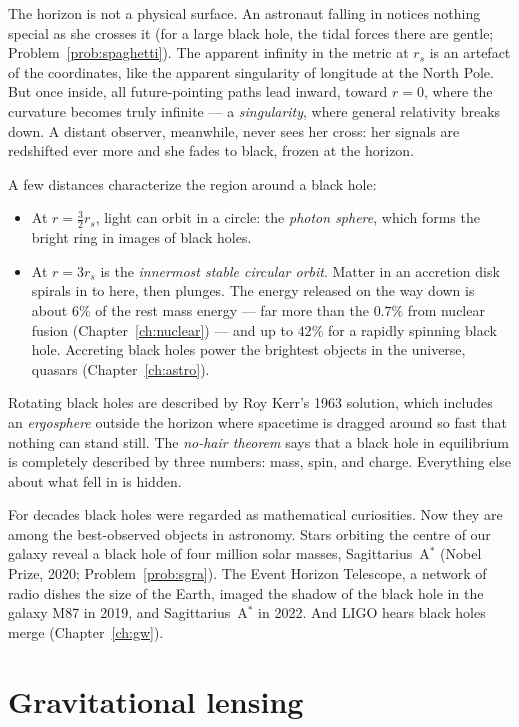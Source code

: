 The horizon is not a physical surface. An astronaut falling in notices nothing special as she crosses it (for a large black hole, the tidal forces there are gentle; Problem~\ref{prob:spaghetti}). The apparent infinity in the metric at $r_s$ is an artefact of the coordinates, like the apparent singularity of longitude at the North Pole. But once inside, all future-pointing paths lead inward, toward $r=0$, where the curvature becomes truly infinite --- a \emph{singularity}, where general relativity breaks down. A distant observer, meanwhile, never sees her cross: her signals are redshifted ever more and she fades to black, frozen at the horizon.

A few distances characterize the region around a black hole:
\begin{itemize}[itemsep=3pt]
  \item At $r = \tfrac32r_s$, light can orbit in a circle: the \emph{photon sphere}, which forms the bright ring in images of black holes.
  \item At $r = 3r_s$ is the \emph{innermost stable circular orbit}. Matter in an accretion disk spirals in to here, then plunges. The energy released on the way down is about $6\%$ of the rest mass energy --- far more than the $0.7\%$ from nuclear fusion (Chapter~\ref{ch:nuclear}) --- and up to $42\%$ for a rapidly spinning black hole. Accreting black holes power the brightest objects in the universe, quasars (Chapter~\ref{ch:astro}).
\end{itemize}
Rotating black holes are described by Roy Kerr's 1963 solution, which includes an \emph{ergosphere} outside the horizon where spacetime is dragged around so fast that nothing can stand still. The \emph{no-hair theorem} says that a black hole in equilibrium is completely described by three numbers: mass, spin, and charge. Everything else about what fell in is hidden.

For decades black holes were regarded as mathematical curiosities. Now they are among the best-observed objects in astronomy. Stars orbiting the centre of our galaxy reveal a black hole of four million solar masses, Sagittarius~A$^*$ (Nobel Prize, 2020; Problem~\ref{prob:sgra}). The Event Horizon Telescope, a network of radio dishes the size of the Earth, imaged the shadow of the black hole in the galaxy M87 in 2019, and Sagittarius~A$^*$ in 2022. And LIGO hears black holes merge (Chapter~\ref{ch:gw}).

\section{Gravitational lensing}

